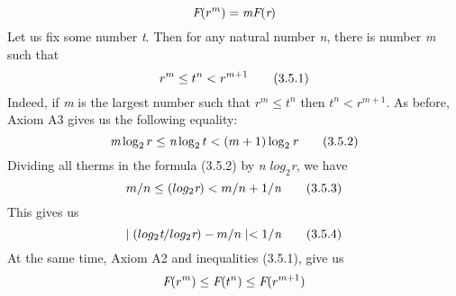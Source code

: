 \documentclass{extbook}
\newcommand{\resetWhitespace}{
	\setlength{\abovedisplayskip}{4pt}
	\setlength{\belowdisplayskip}{4pt}
}
\begin{document}
\begin{equation*}
	\resetWhitespace
	\textit{F}(\textit{$r^m$}) = \textit{mF}(\textit{r})
\end{equation*}
Let us fix some number \textit{t}. Then for any natural number \textit{n}, there is number \textit{m} such that
\begin{equation*}
	\resetWhitespace
	\textit{$r^m$} \leq \textit{$t^n$} < \textit{$r^{m+1}$}
	\tag{3.5.1}
\end{equation*}
Indeed, if \textit{m} is the largest number such that \textit{$r^m \leq t^n$} then \textit{$t^n < r^{m+1}$}.
As before, Axiom A3 gives us the following equality: 
\begin{equation}
	\resetWhitespace
	\textit{m}\log_{2}r \leq \textit{n} \log_{2}t < (m+1) \log_{2}\textit{r}
	\tag{3.5.2}
\end{equation}
Dividing all therms in the formula (3.5.2) by \textit{n} $log_{2}$\textit{r}, we have
\begin{equation}
	\resetWhitespace
	\textit{$m/n$} \leq (log_{2}\textit{r}) < \textit{$m/n$} + 1/\textit{n}
	\tag{3.5.3}
\end{equation}
This gives us
\begin{equation}
	\resetWhitespace
	\mid (log_{2}\textit{t}/log_{2}\textit{r}) - \textit{$m/n$}\mid  < 1/\textit{n}
	\tag{3.5.4}
\end{equation}
At the same time, Axiom A2 and inequalities (3.5.1), give us
\begin{equation}
	\resetWhitespace
	\textit{F}(\textit{$r^m$}) \leq \textit{F}(\textit{$t^n$}) \leq \textit{F}(\textit{$r^{m+1}$})
	\notag
\end{equation}
\end{document}
